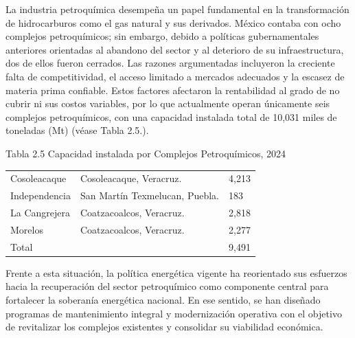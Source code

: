 \documentclass{sener2025}
\begin{document}
La industria petroquímica desempeña un papel fundamental en la transformación de hidrocarburos como el gas natural y sus derivados. México contaba con ocho complejos petroquímicos; sin embargo, debido a políticas gubernamentales anteriores orientadas al abandono del sector y al deterioro de su infraestructura, dos de ellos fueron cerrados. Las razones argumentadas incluyeron la creciente falta de competitividad, el acceso limitado a mercados adecuados y la escasez de materia prima confiable. Estos factores afectaron la rentabilidad al grado de no cubrir ni sus costos variables, por lo que actualmente operan únicamente seis complejos petroquímicos, con una capacidad instalada total de 10,031 miles de toneladas (Mt) (véase Tabla 2.5.).

\begin{tabladoradoCorto}
  \caption{Tabla 2.5 Capacidad instalada por Complejos Petroquímicos, 2024}
  \label{tab:tabla_2_5_capacidad_instalada_}
  \begin{tabularx}{\textwidth}{Vvv}
    \toprule
      &  &  \\
    \midrule
    Cosoleacaque & Cosoleacaque, Veracruz. & 4,213 \\
    Independencia & San Martín Texmelucan, Puebla. & 183 \\
    La Cangrejera & Coatzacoalcos, Veracruz. & 2,818 \\
    Morelos & Coatzacoalcos, Veracruz. & 2,277 \\
    Total &  & 9,491 \\
    \bottomrule
  \end{tabularx}
\end{tabladoradoCorto}
\vspace{-4pt}


Frente a esta situación, la política energética vigente ha reorientado sus esfuerzos hacia la recuperación del sector petroquímico como componente central para fortalecer la soberanía energética nacional. En ese sentido, se han diseñado programas de mantenimiento integral y modernización operativa con el objetivo de revitalizar los complejos existentes y consolidar su viabilidad económica.
\end{document}
